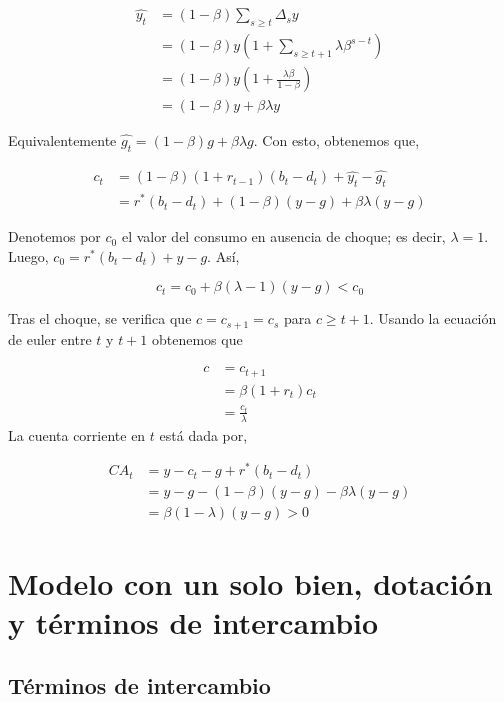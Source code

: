 \documentclass[]{article}
\begin{document}
\[
\begin{align}
\hat{y_t} &= (1-\beta)\sum_{s \geq t} \Delta_s y \\
&= (1-\beta)y(1 + \sum_{s \geq t+1} \lambda \beta^{s-t}) \\
&= (1-\beta)y\left(1 + \frac{\lambda \beta}{1-\beta}\right) \\
&= (1 - \beta)y + \beta \lambda y
\end{align}
\]

Equivalentemente \(\hat{g_t} = (1-\beta)g + \beta \lambda g\). Con esto,
obtenemos que,

\[
\begin{align}
c_t &= (1-\beta)(1+r_{t-1})(b_t-d_t) + \hat{y_t} - \hat{g_t} \\
&= r^*(b_t-d_t) + (1-\beta)(y-g) + \beta \lambda (y-g)
\end{align}
\]

Denotemos por \(c_0\) el valor del consumo en ausencia de choque; es
decir, \(\lambda = 1\). Luego, \(c_0 = r^*(b_t - d_t) + y- g\). Así,

\[
c_t = c_0 + \beta(\lambda - 1)(y-g) < c_0
\]

Tras el choque, se verifica que \(c = c_{s+1} = c_s\) para
\(c \geq t+1\). Usando la ecuación de euler entre \(t\) y \(t+1\)
obtenemos que

\[
\begin{align}
c &= c_{t+1} \\
&= \beta(1 + r_t)c_t \\
&= \frac{c_t}{\lambda}
\end{align}
\] La cuenta corriente en \(t\) está dada por,

\[
\begin{align}
CA_t &= y- c_t - g + r^*(b_t - d_t) \\
& = y - g - (1-\beta)(y-g) - \beta \lambda (y-g) \\
& = \beta(1-\lambda)(y-g) > 0
\end{align}
\]

\section{Modelo con un solo bien, dotación y términos de
intercambio}\label{modelo-con-un-solo-bien-dotacion-y-terminos-de-intercambio}

\subsection{Términos de intercambio}\label{terminos-de-intercambio}
\end{document}
